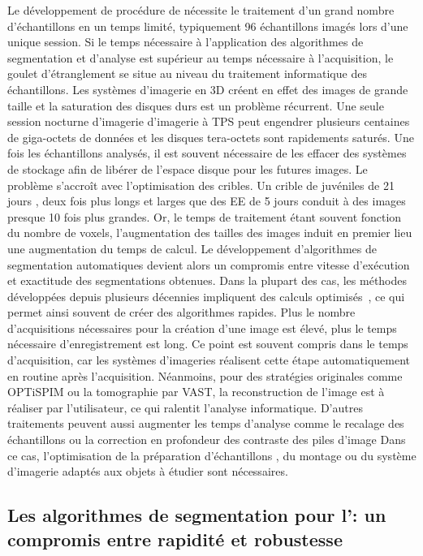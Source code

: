 \documentclass[\main/main.tex]{subfiles}
\begin{document}
%
Le développement de procédure de \hca{} nécessite le traitement d'un grand nombre d'échantillons en un temps limité, typiquement 96 échantillons imagés lors d'une unique session.
%
Si le temps nécessaire à l'application des algorithmes de segmentation et d'analyse est supérieur au temps nécessaire à l'acquisition, le goulet d'étranglement se situe au niveau du traitement informatique des échantillons.   
%
Les systèmes d'imagerie en 3D créent  en effet des images de grande taille et la saturation des disques  durs est un problème récurrent. Une seule session nocturne  d'imagerie d'imagerie à TPS peut engendrer plusieurs centaines de giga-octets de données et les disques tera-octets sont rapidements saturés. Une fois les échantillons analysés, il est souvent nécessaire de les effacer des systèmes de stockage afin de libérer de l'espace disque pour les futures images. Le problème s'accroît avec l'optimisation des cribles. Un crible de juvéniles de 21 jours , deux fois plus longs et larges que des EE de 5 jours conduit à des images presque 10 fois plus grandes.
%
Or, le temps de traitement étant souvent fonction du nombre de voxels, l'augmentation des tailles des images induit en premier lieu une augmentation du temps de calcul.
%
Le développement d'algorithmes de segmentation automatiques devient alors un compromis entre vitesse d'exécution et exactitude des segmentations obtenues.
%
Dans la plupart des cas, les méthodes développées depuis plusieurs décennies impliquent des calculs optimisés~\cite{vandroogenbroeck_1996,perreault_2007,trieu_2007}, ce qui permet ainsi souvent de créer des algorithmes rapides.
%
Plus le nombre d'acquisitions nécessaires pour la création d'une image est élevé, plus le temps nécessaire d'enregistrement est long. Ce point est souvent compris dans le temps d'acquisition, car les systèmes d'imageries réalisent cette étape automatiquement en routine après l'acquisition. Néanmoins, pour des stratégies  originales comme OPTiSPIM ou la tomographie par VAST, la reconstruction de l'image est à réaliser par l'utilisateur, ce qui ralentit l'analyse informatique.
D'autres traitements peuvent aussi augmenter les temps d'analyse comme le recalage des échantillons ou la correction en profondeur des contraste des piles d'image
Dans ce cas, l'optimisation de la préparation d'échantillons , du montage ou du système d'imagerie adaptés aux objets à étudier sont nécessaires.
%

    \subsection{Les algorithmes de segmentation pour l'\hca{}: un compromis entre rapidité et robustesse}
\end{document}
